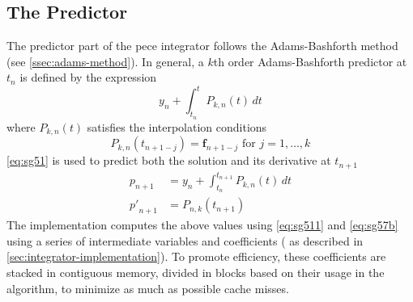 \subsection{The Predictor}\label{ssec:integrator-predictor}
The predictor part of the \gls{pece} integrator follows the Adams-Bashforth 
method (see \autoref{ssec:adams-method}). In general, a $k$th order Adams-Bashforth 
predictor at $t_n$ is defined by the expression 
\begin{equation}\label{eq:sg51}
  y_n + \int_{t_n}^{t} P_{k,n}(t) \,dt
\end{equation}
where $P_{k,n}(t)$ satisfies the interpolation conditions
\begin{equation}\label{eq:sg51b}
  P_{k,n}(t_{n+1-j}) = \bm{f}_{n+1-j} \text{ for } j=1,\dots ,k
\end{equation}
\autoref{eq:sg51} is used to predict both the solution and its derivative at 
$t_{n+1}$
\begin{align}
  p_{n+1}    &= y_n + \int_{t_n}^{t_{n+1}}  P_{k,n} (t) \,dt \label{eq:sg52a}\\
  {p'}_{n+1} &= P_{n,k}(t_{n+1}) \label{eq:sg52b}
\end{align}
The implementation computes the above values using \autoref{eq:sg511} and 
\autoref{eq:sg57b} using a series of intermediate variables and coefficients (
as described in \autoref{sec:integrator-implementation}). To promote efficiency, 
these coefficients are stacked in contiguous memory, divided in blocks based on 
their usage in the algorithm, to minimize as much as possible cache misses.

